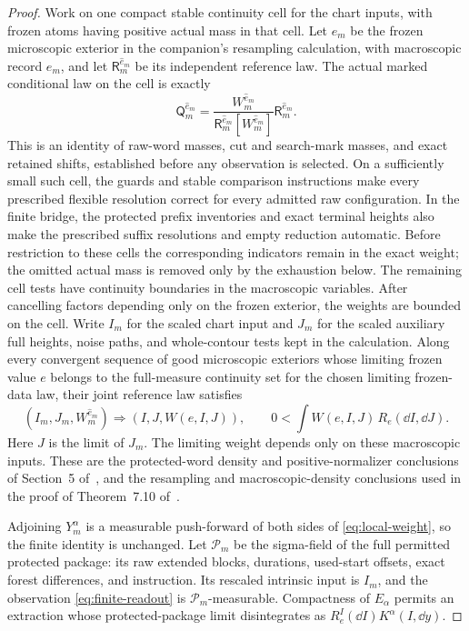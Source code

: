 \begin{proof}
Work on one compact stable continuity cell for the chart inputs,
with frozen atoms having positive actual mass in that cell.  Let
\(\widehat e_m\) be the frozen microscopic exterior in the companion's
resampling calculation, with macroscopic record \(e_m\), and let
\(\mathsf R_m^{\widehat e_m}\) be its independent reference law.
The actual marked conditional law on the cell is exactly
\begin{equation}
 \mathsf Q_m^{\widehat e_m}
   =\frac{W_m^{\widehat e_m}}
          {\mathsf R_m^{\widehat e_m}[W_m^{\widehat e_m}]}
       \mathsf R_m^{\widehat e_m}.
 \label{eq:local-weight}
\end{equation}
This is an identity of raw-word masses, cut and search-mark masses, and
exact retained shifts, established before any observation is selected.
On a sufficiently small such cell, the guards and stable comparison
instructions make every prescribed flexible resolution correct for
every admitted raw configuration.  In the finite bridge, the protected
prefix inventories and exact terminal heights also make the prescribed
suffix resolutions and empty reduction automatic.  Before restriction
to these cells the corresponding indicators remain in the exact weight;
the omitted actual mass is removed only by the exhaustion below.  The
remaining cell tests have continuity boundaries in the macroscopic
variables.  After cancelling factors depending only on the frozen
exterior, the weights are bounded on the cell.  Write \(I_m\) for the
scaled chart input and \(J_m\) for the scaled auxiliary full heights,
noise paths, and whole-contour tests kept in the calculation.  Along
every convergent sequence of good microscopic exteriors whose limiting
frozen value \(e\) belongs to the full-measure continuity set for the
chosen limiting frozen-data law,
their joint reference law satisfies
\begin{equation}
 (I_m,J_m,W_m^{\widehat e_m})
       \Longrightarrow (I,J,W(e,I,J)),
 \qquad
 0<\int W(e,I,J)\,R_e(\dd I,\dd J).
 \label{eq:local-weight-limit}
\end{equation}
Here \(J\) is the limit of \(J_m\).  The limiting weight
depends only on these macroscopic inputs.  These are the
protected-word density and positive-normalizer conclusions of
Section~5 of~\cite{C}, and the resampling and macroscopic-density
conclusions used in the proof of Theorem~7.10 of~\cite{P}.

Adjoining \(Y_m^\alpha\) is a measurable push-forward of both sides
of \eqref{eq:local-weight}, so the finite identity is unchanged.  Let
\(\mathcal P_m\) be the sigma-field of the full permitted protected
package: its raw extended blocks, durations, used-start offsets, exact
forest differences, and instruction.  Its rescaled intrinsic input is
\(I_m\), and the observation \eqref{eq:finite-readout} is
\(\mathcal P_m\)-measurable.  Compactness of \(E_\alpha\) permits an
extraction whose protected-package limit disintegrates as
\(R_e^I(\dd I)K^\alpha(I,\dd y)\).


\end{proof}
